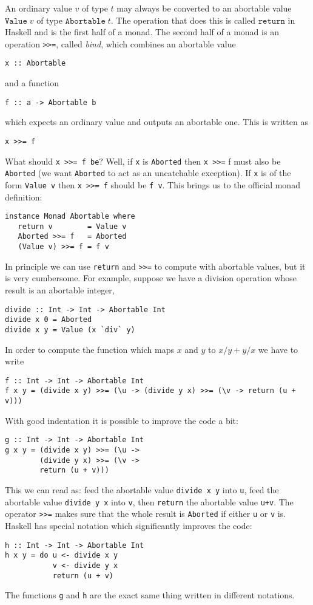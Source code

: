 \documentclass[a4paper,10pt]{article}
\newcommand{\cc}[1]{\lstinline{#1}}
\begin{document}
An ordinary value $v$ of type $t$ may always be converted to an abortable
value $\mathtt{Value}\;v$ of type $\mathtt{Abortable}\;t$. The operation that
does this is called $\mathtt{return}$ in Haskell and is the first half of a
monad. The second half of a monad is an operation \cc{>>=}, called
\emph{bind}, which combines an abortable value
% 
\begin{lstlisting}
x :: Abortable
\end{lstlisting}
% 
and a function
\begin{lstlisting}
f :: a -> Abortable b  
\end{lstlisting}
% 
which expects an ordinary value and outputs an abortable one. This is written
as
% 
\begin{lstlisting}
x >>= f
\end{lstlisting}
% 
What should \cc{x >>= f be}? Well, if \cc{x} is \cc{Aborted} then \cc{x >>=} f
must also be \cc{Aborted} (we want \cc{Aborted} to act as an uncatchable
exception). If \cc{x} is of the form \cc{Value v} then \cc{x >>= f} should be
\cc{f v}. This brings us to the official monad definition:
% 
\begin{lstlisting}
instance Monad Abortable where
   return v        = Value v
   Aborted >>= f   = Aborted
   (Value v) >>= f = f v
\end{lstlisting}
% 
In principle we can use \cc{return} and \cc{>>=} to compute with abortable
values, but it is very cumbersome. For example, suppose we have a division
operation whose result is an abortable integer,
% 
\begin{lstlisting}
divide :: Int -> Int -> Abortable Int
divide x 0 = Aborted
divide x y = Value (x `div` y)  
\end{lstlisting}
% 
In order to compute the function which maps $x$ and $y$ to $x/y + y/x$ we have
to write
% 
\begin{lstlisting}
f :: Int -> Int -> Abortable Int
f x y = (divide x y) >>= (\u -> (divide y x) >>= (\v -> return (u + v)))
\end{lstlisting}
% 
With good indentation it is possible to improve the code a bit:
% 
\begin{lstlisting}
g :: Int -> Int -> Abortable Int
g x y = (divide x y) >>= (\u ->
        (divide y x) >>= (\v ->
        return (u + v)))
\end{lstlisting}
% 
This we can read as: feed the abortable value \cc{divide x y} into \cc{u},
feed the abortable value \cc{divide y x} into \cc{v}, then \cc{return} the
abortable value \cc{u+v}. The operator \cc{>>=} makes sure that the whole
result is \cc{Aborted} if either \cc{u} or \cc{v} is. Haskell has special
notation which significantly improves the code:
% 
\begin{lstlisting}
h :: Int -> Int -> Abortable Int
h x y = do u <- divide x y
           v <- divide y x
           return (u + v)
\end{lstlisting}
% 
The functions \cc{g} and \cc{h} are the exact same thing written in different
notations.
\end{document}
